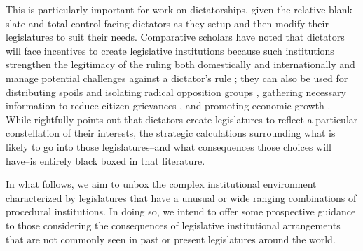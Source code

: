 \documentclass[12pt]{article}
\theoremstyle{plain}		      \newtheorem{assn}{Assumption}
\theoremstyle{plain}		      \newtheorem{prop}{Proposition}
\theoremstyle{plain}		      \newtheorem{lemma}{Lemma}
\theoremstyle{plain}	          \newtheorem{imp}{Implication}
\theoremstyle{plain}	          \newtheorem{hyp}{Hypothesis}
\theoremstyle{definition}		  \newtheorem{defn}{Definition}
\theoremstyle{remark}	          \newtheorem{rem}{Remark}
\theoremstyle{definition}         \newtheorem{case}{Case}
\begin{document}
\indent This is particularly important for work on dictatorships, given the relative blank slate and total control facing dictators as they setup and then modify their legislatures to suit their needs. Comparative scholars have noted that dictators will face incentives to create legislative institutions \citep{gandhi08, svolik12, wright08} because such institutions strengthen the legitimacy of the ruling both domestically and internationally \citep{alagappa95, thayer10} and manage potential challenges against a dictator's rule \citep{frantzktkendalltaylor14, gandhiprz06}; they can also be used for distributing spoils and isolating radical opposition groups \citep{abuza01, lustokar05}, gathering necessary information to reduce citizen grievances \citep{truex16}, and promoting economic growth \citep{gehlbach11, gehlbach12, boix03, jensenmaleskyweymouth14}. While \citet{pepinsky14} rightfully points out that dictators create legislatures to reflect a particular constellation of their interests, the strategic calculations surrounding what is likely to go into those legislatures--and what consequences those choices will have--is entirely black boxed in that literature.

\indent In what follows, we aim to unbox the complex institutional environment characterized by legislatures that have a unusual or wide ranging combinations of procedural institutions. In doing so, we intend to offer some prospective guidance to those considering the consequences of legislative institutional arrangements that are not commonly seen in past or present legislatures around the world. 
\end{document}

